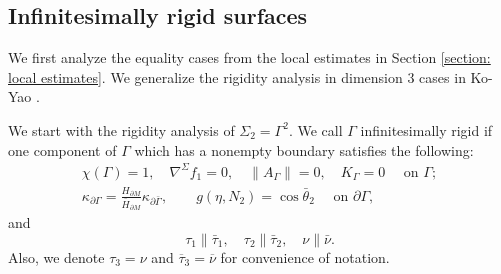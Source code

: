 \documentclass[11pt,letterpaper]{amsart}
\begin{document}
\subsection{Infinitesimally rigid surfaces} We first analyze the equality cases from the local estimates in Section \ref{section: local estimates}. We generalize the rigidity analysis in dimension $3$ cases in Ko-Yao \cite{koyao}.

We start with the rigidity analysis of $\Sigma_2=\Gamma^{2}$. We call $\Gamma$ infinitesimally rigid if one component of $\Gamma$ which has a nonempty boundary satisfies the following:
 \begin{align}
       \chi(\Gamma)=1,\quad \nabla^{\Sigma}f_1=0, \quad \|A_{\Gamma}\|=0,\quad K_{\Gamma}=0 \quad \text{ on }\Gamma;\\
       \kappa_{\partial\Gamma}=\frac{H_{\partial M}}{\bar{H}_{\partial M}}\kappa_{\partial\bar{\Gamma}},\quad \quad g(\eta,N_2)=\cos\bar{\theta}_2\quad \text{ on } \partial\Gamma,
   \end{align}
   and
   \[
   \tau_1\parallel\bar{\tau}_1,\quad \tau_2\parallel\bar{\tau}_2, \quad \nu\parallel\bar{\nu}.
   \]
Also, we denote $\tau_{3} = \nu$ and $\overline{\tau}_{3} = \overline{\nu}$ for convenience of notation.
\end{document}

